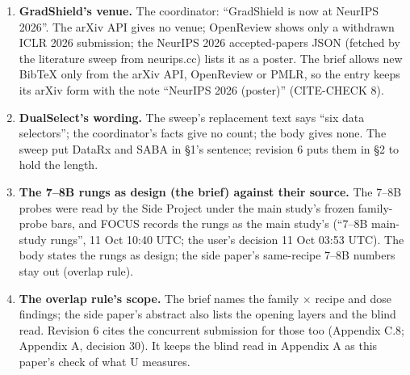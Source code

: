 \documentclass{article}
\theoremstyle{plain}
\theoremstyle{definition}
\theoremstyle{remark}
\begin{document}
\begin{enumerate}
        revision 6 fetched Safety at One Shot by API (also on the coordinator's
        list). The patch is described from its abstract, after harmful
        fine-tuning; the body does not say it works after benign fine-tuning.
  \item \textbf{GradShield's venue.} The coordinator: ``GradShield is now at
        NeurIPS 2026''. The arXiv API gives no venue; OpenReview shows only a
        withdrawn ICLR 2026 submission; the NeurIPS 2026 accepted-papers JSON
        (fetched by the literature sweep from neurips.cc) lists it as a poster.
        The brief allows new BibTeX only from the arXiv API, OpenReview or PMLR,
        so the entry keeps its arXiv form with the note ``NeurIPS 2026
        (poster)'' (CITE-CHECK 8).
  \item \textbf{DualSelect's wording.} The sweep's replacement text says ``six
        data selectors''; the coordinator's facts give no count; the body gives
        none. The sweep put DataRx and SABA in \S{}1's sentence; revision 6 puts
        them in \S{}2 to hold the length.
  \item \textbf{The 7--8B rungs as design (the brief) against their source.} The
        7--8B probes were read by the Side Project under the main study's frozen
        family-probe bars, and FOCUS records the rungs as the main study's
        (``7--8B main-study rungs'', 11 Oct 10:40 UTC; the user's decision 11
        Oct 03:53 UTC). The body states the rungs as design; the side paper's
        same-recipe 7--8B numbers stay out (overlap rule).
  \item \textbf{The overlap rule's scope.} The brief names the family $\times$
        recipe and dose findings; the side paper's abstract also lists the
        opening layers and the blind read. Revision 6 cites the concurrent
        submission for those too (Appendix C.8; Appendix A, decision 30). It
        keeps the blind read in Appendix A as this paper's check of what U
        measures.
\end{enumerate}
\end{document}
